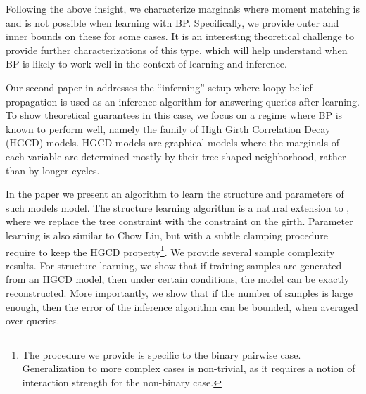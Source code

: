 Following the above insight, we characterize marginals where moment matching is and is not possible when learning with BP.  Specifically, we provide outer and inner bounds on these for some cases. It is an interesting theoretical challenge to provide further characterizations of this type, which will help understand when BP is likely to work well in the context of learning and inference.



Our second paper in  addresses the ``inferning'' setup where loopy belief propagation is used as an inference algorithm for answering queries after learning.  
To show theoretical guarantees in this case, we focus on a regime where BP is known to perform well, 
namely the family of High Girth Correlation Decay (HGCD) models. HGCD models are graphical models where the marginals of each variable are determined mostly by their tree shaped neighborhood, rather than  by longer cycles. 

In the paper we present an algorithm to learn the structure and parameters of such models model.
The structure learning algorithm is a natural extension to \cite{chowLiu}, where we replace the tree constraint with the constraint on the girth.
Parameter learning is also similar to Chow Liu, but with a subtle clamping procedure require to keep the HGCD property\footnote{The procedure we provide is specific to the binary pairwise case. Generalization to more complex cases is non-trivial, as it requires a notion of interaction strength for the non-binary case.}.
We provide several sample complexity results. 
For structure learning, we show that if training samples are generated from an HGCD model, then under certain conditions, the model can be exactly reconstructed.
More importantly, we show that if the number of samples is large enough, then the error of the inference algorithm can be bounded, when averaged over queries.

